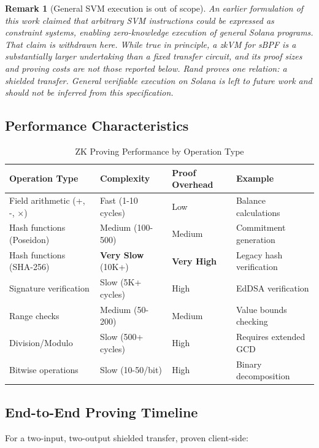 \documentclass[11pt,a4paper]{article}
\newtheorem{remark}[theorem]{Remark}
\begin{document}
\begin{remark}[General SVM execution is out of scope]
An earlier formulation of this work claimed that arbitrary SVM instructions could be expressed as constraint systems, enabling zero-knowledge execution of general Solana programs. That claim is withdrawn here. While true in principle, a zkVM for sBPF is a substantially larger undertaking than a fixed transfer circuit, and its proof sizes and proving costs are not those reported below. Rand proves one relation: a shielded transfer. General verifiable execution on Solana is left to future work and should not be inferred from this specification.
\end{remark}

\subsection{Performance Characteristics}

\begin{table}[H]
\centering
\caption{ZK Proving Performance by Operation Type}
\begin{tabular}{@{}llll@{}}
\toprule
\textbf{Operation Type} & \textbf{Complexity} & \textbf{Proof Overhead} & \textbf{Example} \\ \midrule
Field arithmetic (+, -, $\times$) & Fast (1-10 cycles) & Low & Balance calculations \\
Hash functions (Poseidon) & Medium (100-500) & Medium & Commitment generation \\
Hash functions (SHA-256) & \textbf{Very Slow} (10K+) & \textbf{Very High} & Legacy hash verification \\
Signature verification & Slow (5K+ cycles) & High & EdDSA verification \\
Range checks & Medium (50-200) & Medium & Value bounds checking \\
Division/Modulo & Slow (500+ cycles) & High & Requires extended GCD \\
Bitwise operations & Slow (10-50/bit) & High & Binary decomposition \\ \bottomrule
\end{tabular}
\end{table}

\subsection{End-to-End Proving Timeline}

For a two-input, two-output shielded transfer, proven client-side:
\end{document}
